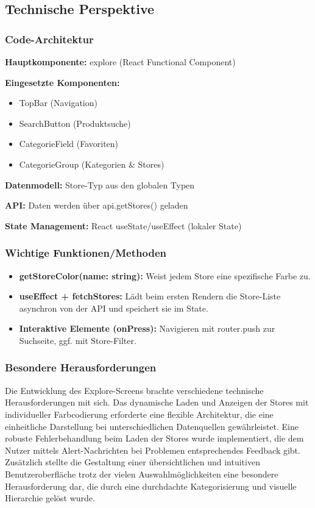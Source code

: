 \subsection{Technische Perspektive}

\subsubsection{Code-Architektur}

\textbf{Hauptkomponente:} explore (React Functional Component)

\noindent\textbf{Eingesetzte Komponenten:}
\begin{itemize}
    \item TopBar (Navigation)
    \item SearchButton (Produktsuche)
    \item CategorieField (Favoriten)
    \item CategorieGroup (Kategorien \& Stores)
\end{itemize}

\noindent\textbf{Datenmodell:} Store-Typ aus den globalen Typen

\noindent\textbf{API:} Daten werden über api.getStores() geladen

\noindent\textbf{State Management:} React useState/useEffect (lokaler State)

\subsubsection{Wichtige Funktionen/Methoden}

\begin{itemize}
    \item \textbf{getStoreColor(name: string):} Weist jedem Store eine spezifische Farbe zu.
    \item \textbf{useEffect + fetchStores:} Lädt beim ersten Rendern die Store-Liste asynchron von der API und speichert sie im State.
    \item \textbf{Interaktive Elemente (onPress):} Navigieren mit router.push zur Suchseite, ggf. mit Store-Filter.
\end{itemize}

\subsubsection{Besondere Herausforderungen}
Die Entwicklung des Explore-Screens brachte verschiedene technische Herausforderungen mit sich. Das dynamische Laden und Anzeigen der Stores mit individueller Farbcodierung erforderte eine flexible Architektur, die eine einheitliche Darstellung bei unterschiedlichen Datenquellen gewährleistet. Eine robuste Fehlerbehandlung beim Laden der Stores wurde implementiert, die dem Nutzer mittels Alert-Nachrichten bei Problemen entsprechendes Feedback gibt. Zusätzlich stellte die Gestaltung einer übersichtlichen und intuitiven Benutzeroberfläche trotz der vielen Auswahlmöglichkeiten eine besondere Herausforderung dar, die durch eine durchdachte Kategorisierung und visuelle Hierarchie gelöst wurde.

